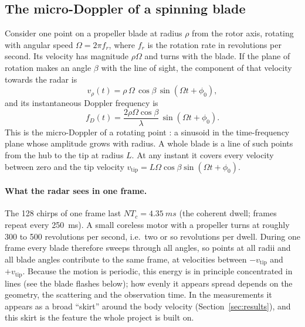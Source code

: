 \documentclass[11pt,a4paper]{article}
\begin{document}
\subsection{The micro-Doppler of a spinning blade}\label{sec:microdoppler}

Consider one point on a propeller blade at radius $\rho$ from the rotor axis, rotating with angular speed $\Omega = 2\pi f_r$, where $f_r$ is the rotation rate in revolutions per second. Its velocity has magnitude $\rho\Omega$ and turns with the blade. If the plane of rotation makes an angle $\beta$ with the line of sight, the component of that velocity towards the radar is
\begin{equation}
v_\rho(t) = \rho\,\Omega\,\cos\beta\,\sin(\Omega t + \phi_0),
\end{equation}
and its instantaneous Doppler frequency is
\begin{equation}
f_D(t) = \frac{2\rho\Omega\cos\beta}{\lambda}\,\sin(\Omega t + \phi_0).
\label{eq:md}
\end{equation}
This is the micro-Doppler of a rotating point \cite{chen}: a sinusoid in the time-frequency plane whose amplitude grows with radius. A whole blade is a line of such points from the hub to the tip at radius $L$. At any instant it covers every velocity between zero and the tip velocity $v_{\mathrm{tip}} = L\Omega\cos\beta\sin(\Omega t+\phi_0)$.

\paragraph{What the radar sees in one frame.} The 128 chirps of one frame last $N T_c = \SI{4.35}{ms}$ (the coherent dwell; frames repeat every \SI{250}{ms}). A small coreless motor with a propeller turns at roughly 300 to 500 revolutions per second, i.e.\ two or so revolutions per dwell. During one frame every blade therefore sweeps through all angles, so points at all radii and all blade angles contribute to the same frame, at velocities between $-v_{\mathrm{tip}}$ and $+v_{\mathrm{tip}}$. Because the motion is periodic, this energy is in principle concentrated in lines (see the blade flashes below); how evenly it appears spread depends on the geometry, the scattering and the observation time. In the measurements it appears as a broad ``skirt'' around the body velocity (Section~\ref{sec:results}), and this skirt is the feature the whole project is built on.
\end{document}
